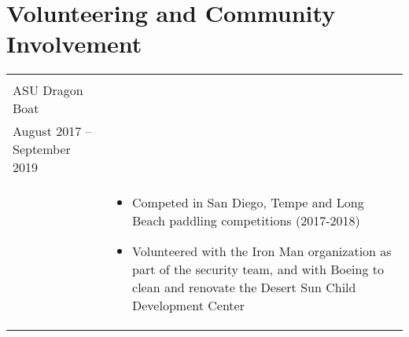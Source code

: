 \documentclass[10pt]{article}
\newcommand{\tabu}[2]{
	\begin{tabular}[t]{ l l }
		#1 & #2
	\end{tabular}}
\begin{document}
	\section{Volunteering and Community Involvement}
		\tabu
		{\begin{minipage}[t]{0.3\linewidth}
				\textbf{Secretary/Race Team Member} \\
				ASU Dragon Boat\\
				August 2017 – September 2019\\
		\end{minipage}}
		{\begin{minipage}[t]{.7\linewidth}
				\begin{itemize}[noitemsep, topsep=0pt]
					\item Competed in San Diego, Tempe and Long Beach paddling competitions (2017-2018)
					\item Volunteered with the Iron Man organization as part of the security team, and with Boeing to clean and renovate the Desert Sun Child Development Center
				\end{itemize}
		\end{minipage}}	
		
\end{document}
